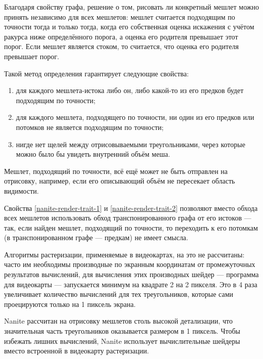 Благодаря свойству графа, решение о том, рисовать ли конкретный мешлет можно принять независимо для всех мешлетов: мешлет считается подходящим по точности тогда и только тогда, когда его собственная оценка искажения с учётом ракурса ниже определённого порога, а оценка его родителя превышает этот порог.
Если мешлет является стоком, то считается, что оценка его родителя превышает порог.

Такой метод определения гарантирует следующие свойства:
\begin{enumerate}
    \item для каждого мешлета-истока либо он, либо какой-то из его предков будет подходящим по точности;
    \label{nanite-render-trait-1}
    \item для каждого мешлета, подходящего по точности, ни один из его предков или потомков не является подходящим по точности;
    \label{nanite-render-trait-2}
    \item нигде нет щелей между отрисовываемыми треугольниками, через которые можно было бы увидеть внутренний объём меша.
\end{enumerate}

Мешлет, подходящий по точности, всё ещё может не быть отправлен на отрисовку, например, если его описывающий объём не пересекает область видимости.

Свойства \ref{nanite-render-trait-1} и \ref{nanite-render-trait-2} позволяют вместо обхода всех мешлетов использовать обход транспонированного графа от его истоков --- так, если найден мешлет, подходящий по точности, то переходить к его потомкам (в транспонированном графе --- предкам) не имеет смысла.

Алгоритмы растеризации, применяемые в видеокартах, на это не рассчитаны: часто им необходимы производные по экранным координатам от промежуточных результатов вычислений, для вычисления этих производных шейдер --- программа для видеокарты --- запускается минимум на квадрате 2 на 2 пикселя.
Это в 4 раза увеличивает количество вычислений для тех треугольников, которые сами проецируются только на 1 пиксель экрана.

Nanite рассчитан на отрисовку мешлетов столь высокой детализации, что значительная часть треугольников оказывается размером в 1 пиксель.
Чтобы избежать лишних вычислений, Nanite использует вычислительные шейдеры вместо встроенной в видеокарту растеризации.
